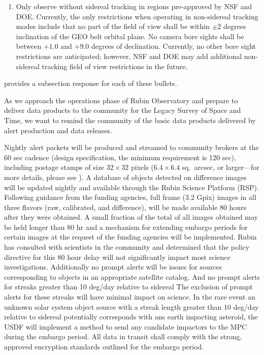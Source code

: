 \begin{enumerate}
\item	Only observe without sidereal tracking in regions pre-approved by NSF and DOE.
Currently, the only restrictions when operating in non-sidereal tracking modes include that no part of the field of view shall be within $\pm 2$ degrees  inclination of the \gls{GEO} belt orbital plane.
No camera bore sights shall be between $+1.0$ and $+9.0$ degrees of declination.
Currently, no other bore sight restrictions are anticipated; however, NSF and DOE may add additional non-sidereal tracking field of view restrictions in the future.


\end{enumerate}

 provides a subsection response for each of these bullets.

As we approach the operations phase of Rubin Observatory and prepare to deliver data products to the community for the Legacy Survey of Space and Time, we want to remind the community of the basic data products delivered by alert production and data releases.

Nightly alert packets will be produced and streamed to community brokers at the 60 sec cadence (design specification, the minimum requirement is 120 sec), including postage stamps of size $32 \times 32$ pixels ($6.4 \times 6.4$ sq.\ arcsec, or larger---for more details, please see ).
A database of objects detected on difference images will be updated nightly and available through the Rubin Science Platform (RSP).
Following guidance from the funding agencies, full frame (3.2 Gpix) images in all three flavors (raw, calibrated, and difference), will be made available 80 hours after they were obtained.
A small fraction of the total of all images obtained may be held longer than 80 hr and a mechanism for extending embargo periods for certain images at the request of the funding agencies will be implemented.
Rubin has consulted with scientists in the community and determined that the policy directive for this 80 hour delay will not significantly impact most science investigations.
Additionally no prompt alerts will be issues for sources corresponding to objects in an appropriate satellite catalog. And no prompt alerts for streaks greater than 10 deg/day relative to sidereal
The exclusion of prompt alerts for these streaks will have minimal impact on science.
In the rare event an unknown solar system object source with a streak length greater than 10 deg/day relative to sidereal potentially corresponds with ans earth impacting asteroid, the \gls{USDF} will implement a method to send any candidate impactors to the \gls{MPC} during the embargo period.
All data in transit shall comply with the strong, approved encryption standards outlined for the embargo period.

